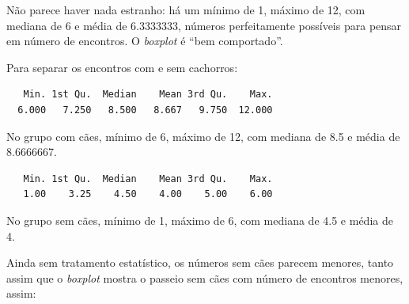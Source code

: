\documentclass[
]{article}
\newenvironment{Shaded}{\begin{snugshade}}{\end{snugshade}}
\newcommand{\AttributeTok}[1]{\textcolor[rgb]{0.77,0.63,0.00}{#1}}
\newcommand{\FunctionTok}[1]{\textcolor[rgb]{0.00,0.00,0.00}{#1}}
\newcommand{\NormalTok}[1]{#1}
\newcommand{\OtherTok}[1]{\textcolor[rgb]{0.56,0.35,0.01}{#1}}
\newcommand{\SpecialCharTok}[1]{\textcolor[rgb]{0.00,0.00,0.00}{#1}}
\newcommand{\StringTok}[1]{\textcolor[rgb]{0.31,0.60,0.02}{#1}}
\begin{document}
Não parece haver nada estranho: há um mínimo de 1, máximo de 12, com
mediana de 6 e média de 6.3333333, números perfeitamente possíveis para
pensar em número de encontros. O \emph{boxplot} é ``bem comportado''.

Para separar os encontros com e sem cachorros:

\begin{Shaded}
\end{Shaded}

\begin{verbatim}
   Min. 1st Qu.  Median    Mean 3rd Qu.    Max. 
  6.000   7.250   8.500   8.667   9.750  12.000 
\end{verbatim}

No grupo com cães, mínimo de 6, máximo de 12, com mediana de 8.5 e média
de 8.6666667.

\begin{Shaded}
\end{Shaded}

\begin{verbatim}
   Min. 1st Qu.  Median    Mean 3rd Qu.    Max. 
   1.00    3.25    4.50    4.00    5.00    6.00 
\end{verbatim}

No grupo sem cães, mínimo de 1, máximo de 6, com mediana de 4.5 e média
de 4.

Ainda sem tratamento estatístico, os números sem cães parecem menores,
tanto assim que o \emph{boxplot} mostra o passeio sem cães com número de
encontros menores, assim:

\begin{Shaded}
\end{Shaded}
\end{document}
